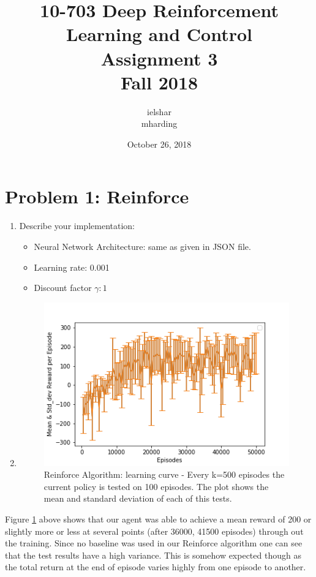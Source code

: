 \documentclass[12pt]{article}
\title{10-703 Deep Reinforcement Learning and Control\\
	Assignment 3\\
	Fall 2018 \\  
}
\author{ielshar \\ mharding}
\date{October 26, 2018}
\begin{document}
	
	\maketitle
	
	\section*{Problem 1: Reinforce}
	\begin{enumerate}
		\item  Describe your implementation:
		\begin{itemize}
			\item Neural Network Architecture:  same as given in JSON file.
			\item Learning rate: 0.001
			\item Discount factor $\gamma: 1$
		\end{itemize}
		\item 
		\begin{figure}[H]
			\begin{center} 
				\includegraphics[scale=.73]{figures/Reinforce_LC_50.png}
			\end{center}
			\caption{Reinforce Algorithm: learning curve - Every k=500 episodes the current policy is tested on 100 episodes. The plot shows the mean and standard deviation of each of this tests.  } 	\label{1}%
		\end{figure}
	\end{enumerate}
	
	Figure \ref{1} above shows that our agent was able to achieve a mean reward of 200  or slightly more or less at several points (after 36000, 41500 episodes) through out the training. Since no baseline was used in our Reinforce algorithm one can see that the test results have a high variance. This is somehow expected though as the total return at the end of episode varies highly from one episode to another.
	
\end{document}

